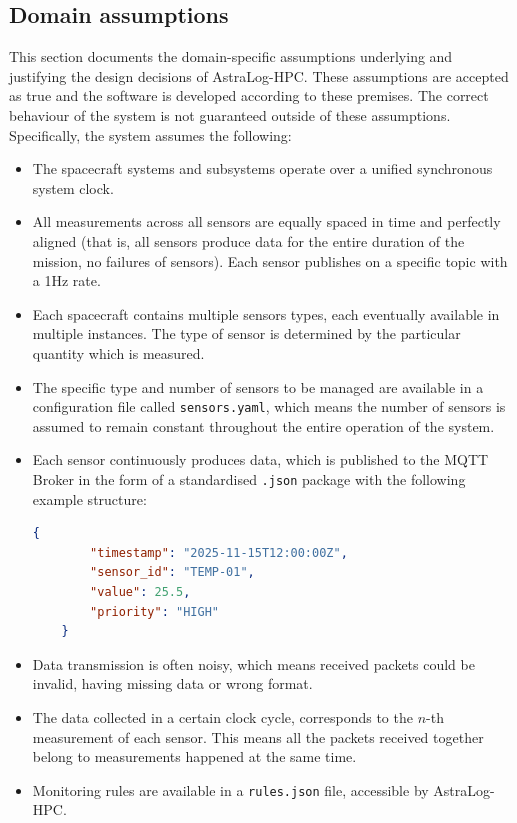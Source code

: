 \documentclass{article}
\begin{document}
\subsection{Domain assumptions}
This section documents the domain-specific assumptions underlying and justifying the design decisions of AstraLog-HPC. These assumptions are accepted as true and the software is developed according to these premises. The correct behaviour of the system is not guaranteed outside of these assumptions.\\
Specifically, the system assumes the following:
\begin{itemize}
    \item The spacecraft systems and subsystems operate over a unified synchronous system clock.
    \item All measurements across all sensors are equally spaced in time and perfectly aligned (that is, all sensors produce data for the entire duration of the mission, no failures of sensors). Each sensor publishes on a specific topic with a 1Hz rate.
    \item Each spacecraft contains multiple sensors types, each eventually available in multiple instances. The type of sensor is determined by the particular quantity which is measured. 
    \item The specific type and number of sensors to be managed are available in a configuration file called \verb|sensors.yaml|, which means the number of sensors is assumed to remain constant throughout the entire operation of the system.
    \item Each sensor continuously produces data, which is published to the MQTT Broker in the form of a standardised \verb|.json| package with the following example structure:
\begin{lstlisting}[language = json]
    {
        "timestamp": "2025-11-15T12:00:00Z",
        "sensor_id": "TEMP-01",
        "value": 25.5,
        "priority": "HIGH"
    }
\end{lstlisting}
    \item Data transmission is often noisy, which means received packets could be invalid, having missing data or wrong format.
    \item The data collected in a certain clock cycle, corresponds to the $n$-th measurement of each sensor. This means all the packets received together belong to measurements happened at the same time.
    \item Monitoring rules are available in a \verb|rules.json| file, accessible by AstraLog-HPC.

\end{itemize}
\end{document}
